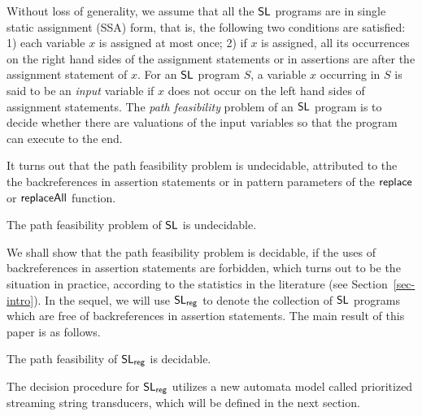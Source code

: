 Without loss of generality, we assume that all the $\mathsf{SL}$ programs are in single static assignment (SSA) form, that is, the following two conditions are satisfied: 1) each variable $x$ is assigned at most once; 2) if $x$ is assigned, all its occurrences on the right hand sides of the assignment statements or in assertions are after the assignment statement of $x$.
%
For an $\mathsf{SL}$ program $S$, a variable $x$ occurring in $S$ is said to be an \emph{input} variable if $x$ does not occur on the left hand sides of assignment statements. The \emph{path feasibility} problem of an $\mathsf{SL}$ program is to decide whether there are valuations of the input variables so that the program can execute to the end.


%





It turns out that the path feasibility problem is undecidable, attributed to the the backreferences in assertion statements or in pattern parameters of the $\mathsf{replace}$ or $\mathsf{replaceAll}$ function. 

\begin{proposition}\label{prop-und}
The path feasibility problem of $\mathsf{SL}$ is undecidable.
\end{proposition}

We shall show that the path feasibility problem is decidable, if the uses of backreferences in assertion statements are forbidden, which turns out to be the situation in practice,  according to the statistics in the literature (see Section~\ref{sec-intro}).
In the sequel, we will use $\mathsf{SL}_{\sf reg}$ to denote the collection of $\mathsf{SL}$ programs which are free of %
backreferences in assertion statements. %
The main result of this paper is as follows.

\begin{theorem}\label{thm-main}
The path feasibility of $\mathsf{SL}_{\sf reg}$ is decidable.
\end{theorem}
The decision procedure for $\mathsf{SL}_{\sf reg}$ utilizes a new automata model called prioritized streaming string transducers, which will be defined in the next section.
